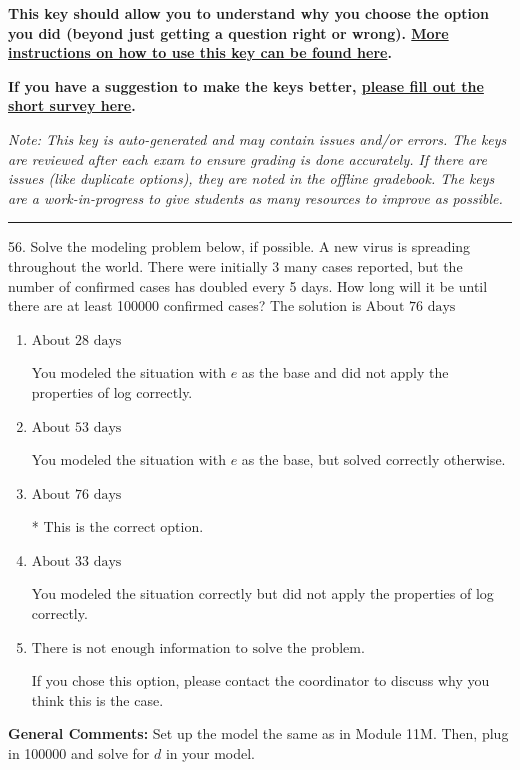 \documentclass{extbook}[14pt]
\begin{document}
\textbf{This key should allow you to understand why you choose the option you did (beyond just getting a question right or wrong). \href{https://xronos.clas.ufl.edu/mac1105spring2020/courseDescriptionAndMisc/Exams/LearningFromResults}{More instructions on how to use this key can be found here}.}

\textbf{If you have a suggestion to make the keys better, \href{https://forms.gle/CZkbZmPbC9XALEE88}{please fill out the short survey here}.}

\textit{Note: This key is auto-generated and may contain issues and/or errors. The keys are reviewed after each exam to ensure grading is done accurately. If there are issues (like duplicate options), they are noted in the offline gradebook. The keys are a work-in-progress to give students as many resources to improve as possible.}

\rule{\textwidth}{0.4pt}

56. Solve the modeling problem below, if possible.
A new virus is spreading throughout the world. There were initially 3 many cases reported, but the number of confirmed cases has doubled every 5 days. How long will it be until there are at least 100000 confirmed cases? 
The solution is $ \text{About } 76 \text{ days} $ 

\begin{enumerate}[label=\Alph*.] 
\item $ \text{About } 28 \text{ days} $ 

 You modeled the situation with $e$ as the base and did not apply the properties of log correctly. 
\item $ \text{About } 53 \text{ days} $ 

 You modeled the situation with $e$ as the base, but solved correctly otherwise. 
\item $ \text{About } 76 \text{ days} $ 

 * This is the correct option. 
\item $ \text{About } 33 \text{ days} $ 

 You modeled the situation correctly but did not apply the properties of log correctly. 
\item $ \text{There is not enough information to solve the problem.} $ 

 If you chose this option, please contact the coordinator to discuss why you think this is the case. 
\end{enumerate} 
 
\textbf{General Comments:} Set up the model the same as in Module 11M. Then, plug in 100000 and solve for $d$ in your model.
\end{document}
